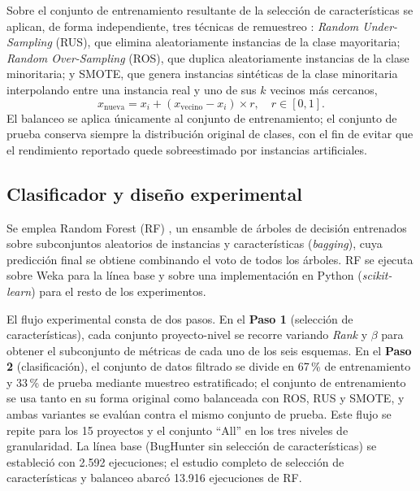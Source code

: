 \documentclass[conference,a4paper]{IEEEtran}
\begin{document}
Sobre el conjunto de entrenamiento resultante de la selección de características se aplican, de forma independiente, tres técnicas de remuestreo \cite{junsomboon2017,hossen2020}: \textit{Random Under-Sampling} (RUS), que elimina aleatoriamente instancias de la clase mayoritaria; \textit{Random Over-Sampling} (ROS), que duplica aleatoriamente instancias de la clase minoritaria; y SMOTE, que genera instancias sintéticas de la clase minoritaria interpolando entre una instancia real y uno de sus $k$ vecinos más cercanos,
\begin{equation}
x_{\text{nueva}} = x_{i} + (x_{\text{vecino}} - x_{i}) \times r, \quad r \in [0,1].
\label{eq:smote}
\end{equation}
El balanceo se aplica únicamente al conjunto de entrenamiento; el conjunto de prueba conserva siempre la distribución original de clases, con el fin de evitar que el rendimiento reportado quede sobreestimado por instancias artificiales.

\subsection{Clasificador y diseño experimental}
\label{sec:diseno}

Se emplea Random Forest (RF) \cite{shah2020}, un ensamble de árboles de decisión entrenados sobre subconjuntos aleatorios de instancias y características (\textit{bagging}), cuya predicción final se obtiene combinando el voto de todos los árboles. RF se ejecuta sobre Weka \cite{weka2005} para la línea base y sobre una implementación en Python (\textit{scikit-learn}) para el resto de los experimentos.

El flujo experimental consta de dos pasos. En el \textbf{Paso 1} (selección de características), cada conjunto proyecto-nivel se recorre variando \textit{Rank} y $\beta$ para obtener el subconjunto de métricas de cada uno de los seis esquemas. En el \textbf{Paso 2} (clasificación), el conjunto de datos filtrado se divide en 67\,\% de entrenamiento y 33\,\% de prueba mediante muestreo estratificado; el conjunto de entrenamiento se usa tanto en su forma original como balanceada con ROS, RUS y SMOTE, y ambas variantes se evalúan contra el mismo conjunto de prueba. Este flujo se repite para los 15 proyectos y el conjunto ``All'' en los tres niveles de granularidad. La línea base (BugHunter sin selección de características) se estableció con 2.592 ejecuciones; el estudio completo de selección de características y balanceo abarcó 13.916 ejecuciones de RF.
\end{document}
